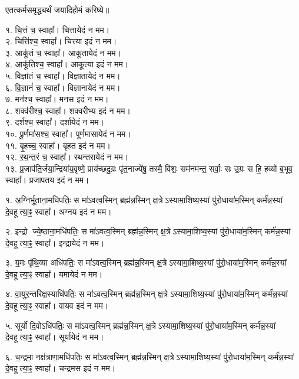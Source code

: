 
एतत्कर्मसमृद्ध्यर्थं जयादिहोमं करिष्ये॥

१. चि॒त्तं च॒ स्वाहा᳚। चित्तायेदं न मम।\\
२. चित्ति॑श्च॒ स्वाहा᳚। चित्त्या इदं न मम।\\
३. आकू॑तं च॒ स्वाहा᳚। आकूतायेदं न मम।\\
४. आकू॑तिश्च॒ स्वाहा᳚। आकूत्या इदं न मम।\\
५. विज्ञा॑तं च॒ स्वाहा᳚। विज्ञातायेदं न मम।\\
६. वि॒ज्ञानं॑ च॒ स्वाहा᳚। विज्ञानायेदं न मम।\\
७. मन॑श्च॒ स्वाहा᳚। मनस इदं न मम।\\
८. शक्व॑रीश्च॒ स्वाहा᳚। शक्वरीभ्य इदं न मम।\\
९. दर्श॑श्च॒ स्वाहा᳚। दर्शायेदं न मम।\\
१०. पू॒र्णमा॑सश्च॒ स्वाहा᳚। पूर्णमासायेदं न मम।\\
११. बृ॒हच्च॒ स्वाहा᳚। बृहत इदं न मम।\\
१२. र॒थ॒न्त॒रं च॒ स्वाहा᳚। रथन्तरायेदं न मम।\\
१३. प्र॒जाप॑ति॒र्जया॒न्द्रिया॑य॒वृष्णे॒ प्राय॑च्छदु॒ग्रः पृ॑त॒नाज्ये॑षु॒ तस्मै॒ विशः॒ सम॑नमन्त॒ सर्वाः॒ सः उ॒ग्रः स हि॒ हव्यो॑ ब॒भूव॒ स्वाहा᳚। प्रजापतय इदं न मम।\\

\clearpage

१. अ॒ग्निर्भू॒ताना॒मधि॑पतिः॒ स मा॑ऽवत्व॒स्मिन् ब्रह्म॑न्न॒स्मिन् क्ष॒त्रेऽस्यामा॒शिष्य॒स्यां पु॑रो॒धाया॑म॒स्मिन् कर्म॑न्न॒स्यां दे॒वहूत्या॒ꣴ॒ स्वाहा᳚। अग्नय इदं न मम।

२. इन्द्रो ज्ये॒ष्ठाना॒मधि॑पतिः॒ स मा॑ऽवत्व॒स्मिन् ब्रह्म॑न्न॒स्मिन् क्ष॒त्रेऽस्यामा॒शिष्य॒स्यां पु॑रो॒धाया॑म॒स्मिन् कर्म॑न्न॒स्यां दे॒वहूत्या॒ꣴ॒ स्वाहा᳚। इन्द्रायेदं न मम।

३. य॒मः पृ॑थि॒व्या अधि॑पतिः॒ स मा॑ऽवत्व॒स्मिन् ब्रह्म॑न्न॒स्मिन् क्ष॒त्रेऽस्यामा॒शिष्य॒स्यां पु॑रो॒धाया॑म॒स्मिन् कर्म॑न्न॒स्यां दे॒वहूत्या॒ꣴ॒ स्वाहा᳚। यमायेदं न मम।

४. वा॒युर॒न्तरि॑क्ष॒स्याधि॑पतिः॒ स मा॑ऽवत्व॒स्मिन् ब्रह्म॑न्न॒स्मिन् क्ष॒त्रेऽस्यामा॒शिष्य॒स्यां पु॑रो॒धाया॑म॒स्मिन् कर्म॑न्न॒स्यां दे॒वहूत्या॒ꣴ॒ स्वाहा᳚। वायव इदं न मम।

५. सूर्यो॑ दि॒वोऽधि॑पतिः॒ स मा॑ऽवत्व॒स्मिन् ब्रह्म॑न्न॒स्मिन् क्ष॒त्रेऽस्यामा॒शिष्य॒स्यां पु॑रो॒धाया॑म॒स्मिन् कर्म॑न्न॒स्यां दे॒वहूत्या॒ꣴ॒ स्वाहा᳚। सूर्यायेदं न मम।

६. च॒न्द्रमा॒ नक्ष॑त्राणा॒मधि॑पतिः॒ स मा॑ऽवत्व॒स्मिन् ब्रह्म॑न्न॒स्मिन् क्ष॒त्रेऽस्यामा॒शिष्य॒स्यां पु॑रो॒धाया॑म॒स्मिन् कर्म॑न्न॒स्यां दे॒वहूत्या॒ꣴ॒ स्वाहा᳚। चन्द्रमस इदं न मम।

